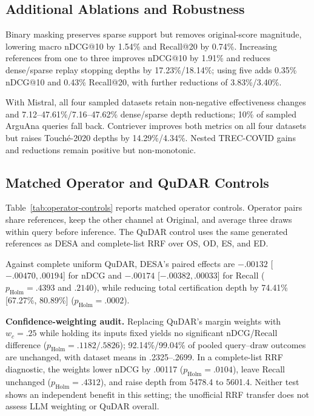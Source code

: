 \label{sec:appendix-analysis}

\subsection{Additional Ablations and Robustness}

\label{sec:additional-results}

Binary masking preserves sparse support but removes original-score magnitude, lowering macro nDCG@10 by 1.54\% and Recall@20 by 0.74\%. Increasing references from one to three improves nDCG@10 by 1.91\% and reduces dense/sparse replay stopping depths by 17.23\%/18.14\%; using five adds 0.35\% nDCG@10 and 0.43\% Recall@20, with further reductions of 3.83\%/3.40\%.

With Mistral, all four sampled datasets retain non-negative effectiveness changes and 7.12--47.61\%/7.16--47.62\% dense/sparse depth reductions; 10\% of sampled ArguAna queries fall back. Contriever improves both metrics on all four datasets but raises Touché-2020 depths by 14.29\%/4.34\%. Nested TREC-COVID gains and reductions remain positive but non-monotonic.

\subsection{Matched Operator and QuDAR Controls}

\label{matched-operator-and-qudar-controls}

Table~\ref{tab:operator-controls} reports matched operator controls. Operator pairs share references, keep the other channel at Original, and average three draws within query before inference. The QuDAR control uses the same generated references as DESA and complete-list RRF over OS, OD, ES, and ED.





Against complete uniform QuDAR, DESA's paired effects are \(-.00132\) {[}\(-.00470,.00194\){]} for nDCG and \(-.00174\) {[}\(-.00382,.00033\){]} for Recall (\(p_{\mathrm{Holm}}=.4393\) and \(.2140\)), while reducing total certification depth by 74.41\% {[}67.27\%, 80.89\%{]} (\(p_{\mathrm{Holm}}=.0002\)).

\begingroup\footnotesize\noindent

\textbf{Confidence-weighting audit.} Replacing QuDAR's margin weights with \(w_c=.25\) while holding its inputs fixed yields no significant nDCG/Recall difference (\(p_{\mathrm{Holm}}=.1182/.5826\)); 92.14\%/99.04\% of pooled query--draw outcomes are unchanged, with dataset means in .2325--.2699. In a complete-list RRF diagnostic, the weights lower nDCG by .00117 (\(p_{\mathrm{Holm}}=.0104\)), leave Recall unchanged (\(p_{\mathrm{Holm}}=.4312\)), and raise depth from 5478.4 to 5601.4. Neither test shows an independent benefit in this setting; the unofficial RRF transfer does not assess LLM weighting or QuDAR overall.

\endgroup

